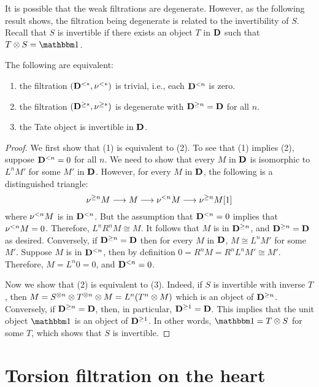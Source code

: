 It is possible that the weak filtrations are degenerate. However, as 
the following result shows, the filtration being degenerate is 
related to the invertibility of $S$. Recall that $S$ is 
invertible if there exists an object $T$ in $\mathbf{D}$ such that $T 
\tensor S = \Unit$.

\begin{prop}\label{prop_filt_trivial_cond}
The following are equivalent:
\begin{enumerate}
\item the filtration $(\mathbf{D}^{< *}, \nu^{< *})$ is trivial,
  i.e., each $\mathbf{D}^{< n}$ is zero.

\item the filtration $(\mathbf{D}^{\geq *}, \nu^{\geq *})$ is 
degenerate with $\mathbf{D}^{\geq n} = \mathbf{D}$ for all $n$.

\item the Tate object is invertible in $\mathbf{D}$.
\end{enumerate}
\end{prop}
\begin{proof}
We first show that (1) is equivalent to (2). To see that (1) implies
(2), suppose $\mathbf{D}^{< n} = 0$ for all $n$. We need to show
that every $M$ in $\mathbf{D}$ is isomorphic to $L^n M'$ for some $M'$
in $\mathbf{D}$. However, for every $M$ in $\mathbf{D}$, the following is
a distinguished triangle:
\[
\nu^{\geq n}M \longrightarrow M \longrightarrow \nu^{< n}M \longrightarrow \nu^{\geq n} M[1]
\]
where $\nu^{< n}M$ is in $\mathbf{D}^{< n}$. But the assumption that
$\mathbf{D}^{< n} = 0$ implies that $\nu^{< n}M = 0$. Therefore, $L^n R^n M
\cong M$. It follows that $M$ is in $\mathbf{D}^{\geq n}$, and
$\mathbf{D}^{\geq n} = \mathbf{D}$ as desired. Conversely, if
$\mathbf{D}^{\geq n} = \mathbf{D}$ then for every $M$ in $\mathbf{D}$, $M \cong
L^n M'$ for some $M'$. Suppose $M$ is in $\mathbf{D}^{< n}$, then by
definition $0 = R^n M = R^nL^n M' \cong M'$.  Therefore, $M = L^n 0 =
0$, and $\mathbf{D}^{< n} = 0$.

Now we show that (2) is equivalent to (3). Indeed, if $S$ is 
invertible with inverse $T$, then $M = S^{\otimes n} \otimes 
T^{\otimes n} \otimes M = L^n(T^n \otimes M)$ which is an object 
of $\mathbf{D}^{\geq n}$. Conversely, if $\mathbf{D}^{\geq n} = 
\mathbf{D}$, then, in particular, $\mathbf{D}^{\geq 1} = \mathbf{D}$. This
implies that the unit object $\Unit$ is an object of $\mathbf{D}^{\geq 1}$.
In other words, $\Unit = T \tensor S$ for some $T$, which shows
that $S$ is invertible.
\end{proof}

\section{Torsion filtration on the heart}

